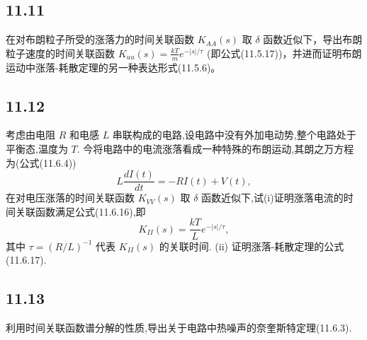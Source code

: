 \newpage
\subsection{11.11}
在对布朗粒子所受的涨落力的时间关联函数 $K_{AA}(s)$ 取 $\delta$ 函数近似下，导出布朗粒子速度的时间关联函数 $K_{uu}(s) = \frac{kT}{m} e^{-|s|/\tau}$ (即公式(11.5.17))，并进而证明布朗运动中涨落-耗散定理的另一种表达形式(11.5.6)。

\newpage
\subsection{11.12}
考虑由电阻 $R$ 和电感 $L$ 串联构成的电路,设电路中没有外加电动势,整个电路处于平衡态,温度为 $T$. 今将电路中的电流涨落看成一种特殊的布朗运动,其朗之万方程为(公式(11.6.4))
$$L \frac{dI(t)}{dt} = -RI(t) + V(t),$$
在对电压涨落的时间关联函数 $K_{VV}(s)$ 取 $\delta$ 函数近似下,试(i)证明涨落电流的时间关联函数满足公式(11.6.16),即
$$K_{II}(s) = \frac{kT}{L} e^{-|s|/\tau},$$
其中 $\tau = (R/L)^{-1}$ 代表 $K_{II}(s)$ 的关联时间.
(ii) 证明涨落-耗散定理的公式(11.6.17).

\newpage
\subsection{11.13}
利用时间关联函数谱分解的性质,导出关于电路中热噪声的奈奎斯特定理(11.6.3).
